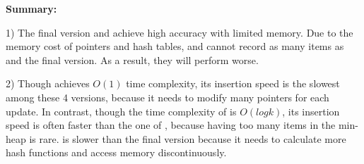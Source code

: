 \noindent\textbf{Summary:}

1) The final version and \secarr{} achieve high accuracy with limited memory. Due to the memory cost of pointers and hash tables, \secss{} and \secmin{} cannot record as many items as \secarr{} and the final version. As a result, they will perform worse.

2) Though \secss{} achieves $O(1)$ time complexity, its insertion speed is the slowest among these 4 versions, because it needs to modify many pointers for each update. In contrast, though the time complexity of \secmin{} is $O(logk)$, its insertion speed is often faster than the one of \secss{}, because having too many items in the min-heap is rare. \secarr{} is slower than the final version because it needs to calculate more hash functions and access memory discontinuously.
